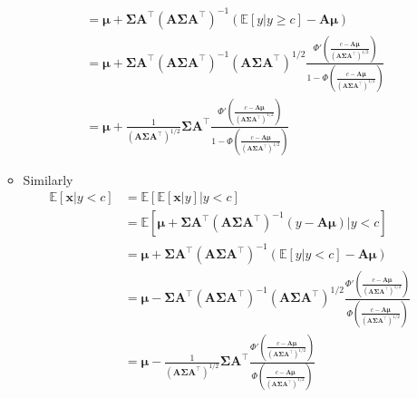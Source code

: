 \documentclass[12pt,a4paper]{article}
\begin{document}
\begin{itemize}
\begin{itemize}
\begin{align}
        & = \bm{\mu}+\bm{\Sigma}\bm{A}^{\top}(\bm{A}\bm{\Sigma}\bm{A}^{\top})^{-1}(\mathbb{E}\left[y| y\geq c \right]-\bm{A}\bm{\mu}) \nonumber \\
        & = \bm{\mu}+\bm{\Sigma}\bm{A}^{\top}(\bm{A}\bm{\Sigma}\bm{A}^{\top})^{-1}(\bm{A}\bm{\Sigma}\bm{A}^{\top})^{1/2} \frac{\Phi'\left(\frac{c - \bm{A}\bm{\mu}}{(\bm{A}\bm{\Sigma}\bm{A}^{\top})^{1/2}}\right) }{1-\Phi\left(\frac{c - \bm{A}\bm{\mu}}{(\bm{A}\bm{\Sigma}\bm{A}^{\top})^{1/2}}\right)} \nonumber \\
        & = \bm{\mu}+\frac{1}{(\bm{A}\bm{\Sigma}\bm{A}^{\top})^{1/2}}\bm{\Sigma}\bm{A}^{\top}\frac{\Phi'\left(\frac{c - \bm{A}\bm{\mu}}{(\bm{A}\bm{\Sigma}\bm{A}^{\top})^{1/2}}\right) }{1-\Phi\left(\frac{c - \bm{A}\bm{\mu}}{(\bm{A}\bm{\Sigma}\bm{A}^{\top})^{1/2}}\right)}
    \nonumber%
    \end{align}
  \item Similarly
    \begin{align}
      \mathbb{E}\left[\bm{x}|y< c \right]
        & = \mathbb{E}\left[\mathbb{E}\left[\bm{x}|y\right]|y< c \right] \nonumber \\
        & = \mathbb{E}\left[\bm{\mu}+\bm{\Sigma}\bm{A}^{\top}(\bm{A}\bm{\Sigma}\bm{A}^{\top})^{-1}(y-\bm{A}\bm{\mu}) \Big| y< c \right] \nonumber \\
        & = \bm{\mu}+\bm{\Sigma}\bm{A}^{\top}(\bm{A}\bm{\Sigma}\bm{A}^{\top})^{-1}(\mathbb{E}\left[y| y< c \right]-\bm{A}\bm{\mu}) \nonumber \\
        & = \bm{\mu}-\bm{\Sigma}\bm{A}^{\top}(\bm{A}\bm{\Sigma}\bm{A}^{\top})^{-1}(\bm{A}\bm{\Sigma}\bm{A}^{\top})^{1/2} \frac{\Phi'\left(\frac{c - \bm{A}\bm{\mu}}{(\bm{A}\bm{\Sigma}\bm{A}^{\top})^{1/2}}\right) }{\Phi\left(\frac{c - \bm{A}\bm{\mu}}{(\bm{A}\bm{\Sigma}\bm{A}^{\top})^{1/2}}\right)} \nonumber \\
        & = \bm{\mu}-\frac{1}{(\bm{A}\bm{\Sigma}\bm{A}^{\top})^{1/2}}\bm{\Sigma}\bm{A}^{\top}\frac{\Phi'\left(\frac{c - \bm{A}\bm{\mu}}{(\bm{A}\bm{\Sigma}\bm{A}^{\top})^{1/2}}\right) }{\Phi\left(\frac{c - \bm{A}\bm{\mu}}{(\bm{A}\bm{\Sigma}\bm{A}^{\top})^{1/2}}\right)}
    \nonumber%
    \end{align}
    
  \end{itemize}

\end{itemize}
\end{document}
